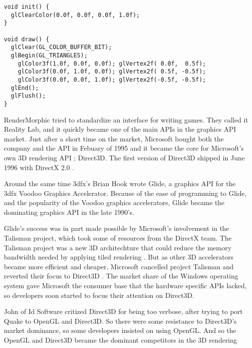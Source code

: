 \begin{lstlisting}[language={[ANSI]C}, caption={OpenGL 1.0 program written in C, that renders a triangle with different colors on the points, and linear interpolation between the colors. This method uses the fixed pipeline to render the triangle. A method which has been deprecated since OpenGL 3.0.}, label={lst:opengl10}]
void init() {
  glClearColor(0.0f, 0.0f, 0.0f, 1.0f);
}

void draw() {
  glClear(GL_COLOR_BUFFER_BIT);
  glBegin(GL_TRIANGLES);
    glColor3f(1.0f, 0.0f, 0.0f); glVertex2f( 0.0f,  0.5f);
    glColor3f(0.0f, 1.0f, 0.0f); glVertex2f( 0.5f, -0.5f);
    glColor3f(0.0f, 0.0f, 1.0f); glVertex2f(-0.5f, -0.5f);
  glEnd();
  glFlush();
}
\end{lstlisting}

RenderMorphic tried to standardize an interface for writing games.
They called it Reality Lab, and it quickly became one of the main \glspl{API} in the graphics \gls{API} market. 
Just after a short time on the market, Microsoft bought both the company and the \gls{API} in Febuary of 1995 and it became the core for Microsoft's own 3D rendering \gls{API} \cite{1997crushed}; Direct3D.
The first version of Direct3D shipped in June 1996 with DirectX 2.0 \cite{wikipedia????directx}. 

Around the same time 3dfx's Brian Hook wrote Glide, a graphics API for the 3dfx Voodoo Graphics Accelerator.
Because of the ease of programming to Glide, and the popularity of the Voodoo graphics accelerators, Glide became the dominating graphics \gls{API} in the late 1990's.

Glide's success was in part made possible by Microsoft's involvement in the Talisman project, which took some of resources from the DirectX team.
The Talisman project was a new 3D architechture that could reduce the memory bandwidth needed by applying tiled rendering \cite{torborg1996talisman}.
But as other 3D accelerators became more efficient and cheaper, Microsoft cancelled project Talisman and reverted their focus to Direct3D \cite{wikipedia????talisman}.
The market share of the Windows operating system gave Microsoft the consumer base that the hardware specific \glspl{API} lacked, so developers soon started to focus their attention on Direct3D.

John \citet{carmack1996plan} of Id Software critized Direct3D for being too verbose, after trying to port Quake to OpenGL and Direct3D.
So there were some resistance to Direct3D's market dominance, so some developers insisted on using OpenGL.
And so the OpenGL and Direct3D became the dominant competitors in the 3D rendering 

